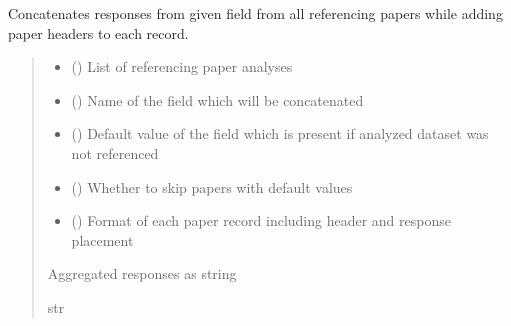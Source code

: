 \documentclass[letterpaper,10pt,english]{sphinxmanual}
\begin{document}

\begin{fulllineitems}
\label{\detokenize{reference_analysis_aggregation:reference_analysis_aggregation.concatenate_field}}
\pysigstartsignatures
\pysiglinewithargsret
{}
{\sphinxparamcomma {}\sphinxparamcomma {}\sphinxparamcomma {}\sphinxparamcomma {}}
{}
\pysigstopsignatures
\sphinxAtStartPar
Concatenates responses from given field from all referencing papers while adding paper headers to each record.
\begin{quote}\begin{description}
\begin{itemize}
\item {} 
\sphinxAtStartPar
{} () \textendash{} List of referencing paper analyses

\item {} 
\sphinxAtStartPar
{} () \textendash{} Name of the field which will be concatenated

\item {} 
\sphinxAtStartPar
{} () \textendash{} Default value of the field which is present if analyzed dataset was not referenced

\item {} 
\sphinxAtStartPar
{} () \textendash{} Whether to skip papers with default values

\item {} 
\sphinxAtStartPar
{} () \textendash{} Format of each paper record including header and response placement

\end{itemize}

\sphinxAtStartPar
Aggregated responses as string

\sphinxAtStartPar
str

\end{description}\end{quote}

\end{fulllineitems}
\end{document}
